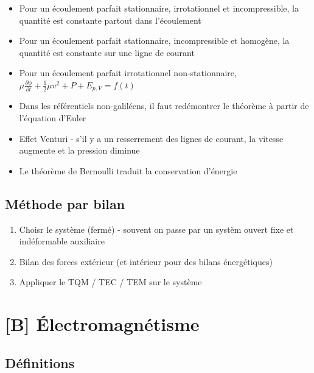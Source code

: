 \documentclass[openany]{book}
\begin{document}
\begin{itemize}
    \item Pour un écoulement parfait stationnaire, irrotationnel et incompressible, la quantité est constante partout dans l'écoulement
    \item Pour un écoulement parfait stationnaire, incompressible et homogène, la quantité est constante sur une ligne de courant
    \item Pour un écoulement parfait irrotationnel non-stationnaire, $\mu \frac{\partial \phi}{\partial t} + \frac{1}{2}\mu v^2 + P + E_{p, V} = f(t)$
    \item Dans les référentiels non-galiléens, il faut redémontrer le théorème à partir de l'équation d'Euler
    \item Effet Venturi - s'il y a un resserrement des lignes de courant, la vitesse augmente et la pression diminue
    \item Le théorème de Bernoulli traduit la conservation d'énergie
\end{itemize}

\section{Méthode par bilan}

\begin{enumerate}
    \item Choisr le système (fermé) - souvent on passe par un systèm ouvert fixe et indéformable auxiliaire
    \item Bilan des forces extérieur (et intérieur pour des bilans énergétiques)
    \item Appliquer le TQM / TEC / TEM sur le système
\end{enumerate}

\clearpage

\chapter{[B] Électromagnétisme}

\section{Définitions}
\end{document}
